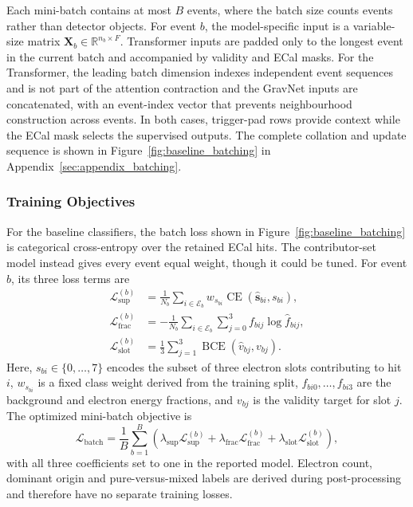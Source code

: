 Each mini-batch contains at most \(B\) events, where the batch size counts
events rather than detector objects. For event \(b\), the model-specific input
is a variable-size matrix
\(\mathbf{X}_b\in\mathbb{R}^{n_b\times F}\). Transformer inputs are padded
only to the longest event in the current batch and accompanied by validity and
ECal masks. For the Transformer, the leading batch dimension indexes independent event
sequences and is not part of the attention contraction and the GravNet inputs are concatenated, with an event-index vector that
prevents neighbourhood construction across events. In both cases, trigger-pad
rows provide context while the ECal mask selects the supervised outputs. The
complete collation and update sequence is shown in
Figure~\ref{fig:baseline_batching} in
Appendix~\ref{sec:appendix_batching}.



\subsubsection{Training Objectives}
\label{sec:method_training}

For the baseline classifiers, the batch loss shown in
Figure~\ref{fig:baseline_batching} is categorical cross-entropy over the
retained ECal hits. The contributor-set model instead gives every event equal
weight, though it could be tuned. For event \(b\), its three loss terms
are
\begin{align}
    \mathcal{L}_{\mathrm{sup}}^{(b)}
    &=
    \frac{1}{N_b}\sum_{i\in\mathcal{E}_b}
    w_{s_{bi}}\operatorname{CE}
    \!\left(\widehat{\boldsymbol{s}}_{bi},s_{bi}\right), \\
    \mathcal{L}_{\mathrm{frac}}^{(b)}
    &=
    -\frac{1}{N_b}\sum_{i\in\mathcal{E}_b}
    \sum_{j=0}^{3} f_{bij}\log \widehat f_{bij}, \\
    \mathcal{L}_{\mathrm{slot}}^{(b)}
    &=
    \frac{1}{3}\sum_{j=1}^{3}
    \operatorname{BCE}\!\left(\widehat v_{bj},v_{bj}\right).
\end{align}
Here, \(s_{bi}\in\{0,\ldots,7\}\) encodes the subset of three electron slots
contributing to hit \(i\), \(w_{s_{bi}}\) is a fixed class weight derived from
the training split, \(f_{bi0},\ldots,f_{bi3}\) are the background and
electron energy fractions, and \(v_{bj}\) is the validity target for slot
\(j\). The optimized mini-batch objective is
\begin{equation}
    \mathcal{L}_{\mathrm{batch}}
    =
    \frac{1}{B}\sum_{b=1}^{B}
    \left(
    \lambda_{\mathrm{sup}}\mathcal{L}_{\mathrm{sup}}^{(b)}
    +\lambda_{\mathrm{frac}}\mathcal{L}_{\mathrm{frac}}^{(b)}
    +\lambda_{\mathrm{slot}}\mathcal{L}_{\mathrm{slot}}^{(b)}
    \right),
\end{equation}
with all three coefficients set to one in the reported model. Electron count,
dominant origin and pure-versus-mixed labels are derived during
post-processing and therefore have no separate training losses.


